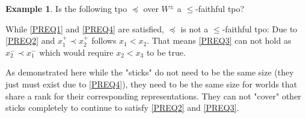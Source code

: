 \documentclass[english, 12pt]{scrartcl}
\theoremstyle{definition}
\newtheorem{example}{Example}[section]
\theoremstyle{definition}
\theoremstyle{definition}
\begin{document}
\begin{example}
    \label{example:example-faithful-tpo}
    Is the following tpo $\preceq$ over $W^{\pm}$ a $\leq$-faithful tpo?
        
    \begin{figure}[h]
        \centering
    \end{figure}
    
    While \ref{PREQ1} and \ref{PREQ4} are satisfied, $\preceq$ is not a $\leq$-faithful tpo: Due to \ref{PREQ2} and $x_{1}^{+} \prec x_{2}^{+}$ follows $x_{1} < x_{2}$. That means \ref{PREQ3} can not hold as $x_{2}^{-} \prec x_{1}^{-}$ which would require $x_{2} < x_{3}$ to be true.
    
    As demonstrated here while the "sticks" do not need to be the same size (they just must exist due to \ref{PREQ4}), they need to be the same size for worlds that share a rank for their corresponding representations. They can not "cover" other sticks completely to continue to satisfy \ref{PREQ2} and \ref{PREQ3}.
\end{example}

\newpage
\end{document}
